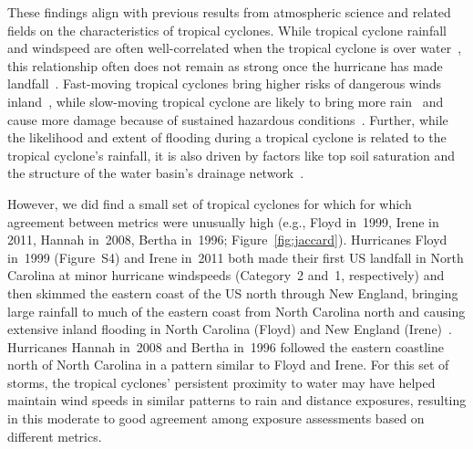 These findings align with previous results from atmospheric science and related
fields on the characteristics of tropical cyclones. While tropical cyclone
rainfall and windspeed are often well-correlated when the tropical cyclone is
over water~\parencite{cerveny2000}, this relationship often does not remain as
strong once the hurricane has made landfall~\parencite{jiang2008}.  Fast-moving
tropical cyclones bring higher risks of dangerous winds
inland~\parencite{kruk2010}, while slow-moving tropical cyclone are likely to
bring more rain~\parencite{rappaport2000} and cause more damage because of
sustained hazardous conditions~\parencite{rezapour2014}. Further, while the
likelihood and extent of flooding during a tropical cyclone is related to the
tropical cyclone's rainfall, it is also driven by factors like top soil
saturation and the structure of the water basin's drainage
network~\parencite{chen2015, rees2001}. 

However, we did find a small set of tropical cyclones for which for which
agreement between metrics were unusually high (e.g., Floyd in~1999, Irene in
2011, Hannah in~2008, Bertha in~1996; Figure~\ref{fig:jaccard}).  Hurricanes
Floyd in~1999 (Figure~S4) and Irene in~2011 both made their first \ac{US}
landfall in North Carolina at minor hurricane windspeeds (Category~2 and~1,
respectively) and then skimmed the eastern coast of the \ac{US} north through
New England, bringing large rainfall to much of the eastern coast from North
Carolina north and causing extensive inland flooding in North Carolina (Floyd)
and New England (Irene)~\parencite{avila2013atlantic, lawrence2000atlantic}.
Hurricanes Hannah in~2008 and Bertha in~1996 followed the eastern coastline
north of North Carolina in a pattern similar to Floyd and Irene. For this set
of storms, the tropical cyclones' persistent proximity to water may have helped
maintain wind speeds in similar patterns to rain and distance exposures,
resulting in this moderate to good agreement among exposure assessments based
on different metrics. 

